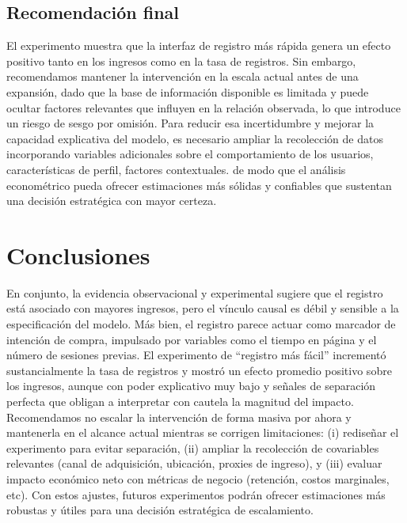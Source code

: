 \documentclass[conference]{IEEEtran}
\begin{document}
\subsection{Recomendación final}


El experimento muestra que la interfaz de registro más rápida genera un efecto positivo tanto en los ingresos como en la tasa de registros. Sin embargo, recomendamos mantener la intervención en la escala actual antes de una expansión, dado que la base de información disponible es limitada y puede ocultar factores relevantes que influyen en la relación observada, lo que introduce un riesgo de sesgo por omisión. Para reducir esa incertidumbre y mejorar la capacidad explicativa del modelo, es necesario ampliar la recolección de datos incorporando variables adicionales sobre el comportamiento de los usuarios, características de perfil, factores contextuales. de modo que el análisis econométrico pueda ofrecer estimaciones más sólidas y confiables que sustentan una decisión estratégica con mayor certeza.





\section{Conclusiones}


En conjunto, la evidencia observacional y experimental sugiere que el registro está asociado con mayores ingresos, pero el vínculo causal es débil y sensible a la especificación del modelo. Más bien, el registro parece actuar como marcador de intención de compra, impulsado por variables como el tiempo en página y el número de sesiones previas. El experimento de “registro más fácil” incrementó sustancialmente la tasa de registros y mostró un efecto promedio positivo sobre los ingresos, aunque con poder explicativo muy bajo y señales de separación perfecta que obligan a interpretar con cautela la magnitud del impacto. Recomendamos no escalar la intervención de forma masiva por ahora y mantenerla en el alcance actual mientras se corrigen limitaciones: (i) rediseñar el experimento para evitar separación, (ii) ampliar la recolección de covariables relevantes (canal de adquisición, ubicación, proxies de ingreso), y (iii) evaluar impacto económico neto con métricas de negocio (retención, costos marginales, etc). Con estos ajustes, futuros experimentos podrán ofrecer estimaciones más robustas y útiles para una decisión estratégica de escalamiento.
\end{document}

